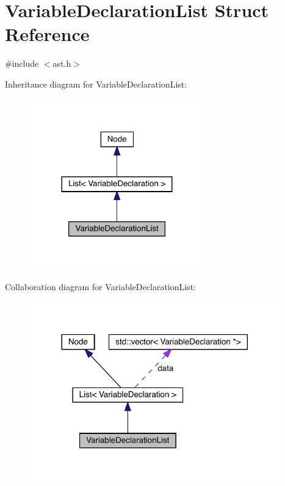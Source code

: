 \hypertarget{struct_variable_declaration_list}{}\section{Variable\+Declaration\+List Struct Reference}
\label{struct_variable_declaration_list}


{\ttfamily \#include $<$ast.\+h$>$}



Inheritance diagram for Variable\+Declaration\+List\+:
\nopagebreak
\begin{figure}[H]
\begin{center}
\leavevmode
\includegraphics[width=215pt]{struct_variable_declaration_list__inherit__graph}
\end{center}
\end{figure}


Collaboration diagram for Variable\+Declaration\+List\+:
\nopagebreak
\begin{figure}[H]
\begin{center}
\leavevmode
\includegraphics[width=308pt]{struct_variable_declaration_list__coll__graph}
\end{center}
\end{figure}
